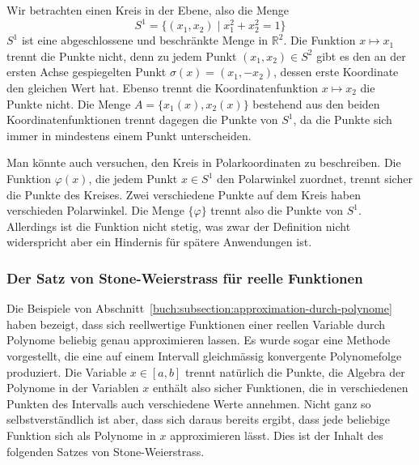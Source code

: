 \begin{beispiel}
Wir betrachten einen Kreis in der Ebene, also die Menge
\[
S^1
=
\{(x_1,x_2)\;|\; x_1^2 + x_2^2=1\}
\]
$S^1$ ist eine abgeschlossene und beschränkte Menge in $\mathbb{R}^2$.
Die Funktion $x\mapsto x_1$ trennt die Punkte nicht, denn zu jedem
Punkt $(x_1,x_2)\in S^2$ gibt es den an der ersten Achse
gespiegelten Punkt $\sigma(x)=(x_1,-x_2)$, dessen erste Koordinate
den gleichen Wert hat.
Ebenso trennt die Koordinatenfunktion $x\mapsto x_2$ die Punkte nicht.
Die Menge $A=\{ x_1(x), x_2(x)\}$ bestehend aus den beiden
Koordinatenfunktionen trennt dagegen die Punkte von $S^1$, da die Punkte
sich immer in mindestens einem Punkt unterscheiden.

Man könnte auch versuchen, den Kreis in Polarkoordinaten zu beschreiben.
Die Funktion $\varphi(x)$, die jedem Punkt $x\in S^1$ den Polarwinkel
zuordnet, trennt sicher die Punkte des Kreises.
Zwei verschiedene Punkte auf dem Kreis haben verschieden Polarwinkel.
Die Menge $\{\varphi\}$ trennt also die Punkte von $S^1$.
Allerdings ist die Funktion nicht stetig, was zwar der Definition
nicht widerspricht aber ein Hindernis für spätere Anwendungen ist.
\end{beispiel}


\subsubsection{Der Satz von Stone-Weierstrass für reelle Funktionen}
Die Beispiele von Abschnitt~\ref{buch:subsection:approximation-durch-polynome}
haben bezeigt, dass sich reellwertige Funktionen einer reellen
Variable durch Polynome beliebig genau approximieren lassen.
Es wurde sogar eine Methode vorgestellt, die eine auf einem Intervall
gleichmässig konvergente Polynomefolge produziert.
Die Variable $x\in[a,b]$ trennt natürlich die Punkte, die Algebra der
Polynome in der Variablen $x$ enthält also sicher Funktionen, die in
verschiedenen Punkten des Intervalls auch verschiedene Werte annehmen.
Nicht ganz so selbstverständlich ist aber, dass sich daraus bereits
ergibt, dass jede beliebige Funktion sich als Polynome in $x$
approximieren lässt.
Dies ist der Inhalt des folgenden Satzes von Stone-Weierstrass.

